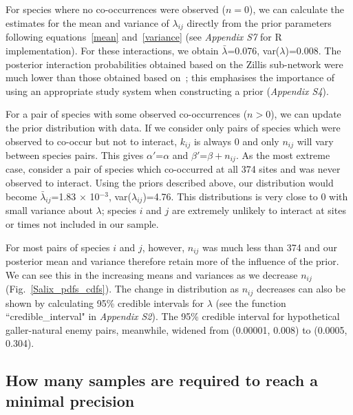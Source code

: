 \documentclass[12pt]{article}
\begin{document}
\begin{spacing}{2.0}
      For species where no co-occurrences were observed ($n=0$), we can calculate the estimates for the mean and variance of $\lambda_{ij}$ directly from the prior parameters following equations~\ref{mean} and~\ref{variance} (see \emph{Appendix S7} for R implementation). For these interactions, we obtain $\bar\lambda$=0.076, var($\lambda$)=0.008. The posterior interaction probabilities obtained based on the Zillis sub-network were much lower than those obtained based on~\citet[Data available from the Dryad Digital Repository: https://doi.org/10.5061/dryad.g7805]{Barbour2016}; this emphasises the importance of using an appropriate study system when constructing a prior (\emph{Appendix S4}).


      For a pair of species with some observed co-occurrences ($n>0$), we can update the prior distribution with data. If we consider only pairs of species which were observed to co-occur but not to interact, $k_{ij}$ is always 0 and only $n_{ij}$ will vary between species pairs. This gives $\alpha'$=$\alpha$ and $\beta'$=$\beta + n_{ij}$. As the most extreme case, consider a pair of species which co-occurred at all 374 sites and was never observed to interact. Using the priors described above, our distribution would become $\bar\lambda_{ij}$=1.83 $\times$ 10$^{-3}$, var($\lambda_{ij}$)=4.76. This distributions is very close to 0 with small variance about $\lambda$; species $i$ and $j$ are extremely unlikely to interact at sites or times not included in our sample.


      For most pairs of species $i$ and $j$, however, $n_{ij}$ was much less than 374 and our posterior mean and variance therefore retain more of the influence of the prior. We can see this in the increasing means and variances as we decrease $n_{ij}$ (Fig.~\ref{Salix_pdfs_cdfs}). The change in distribution as $n_{ij}$ decreases can also be shown  by calculating 95\% credible intervals for $\lambda$ (see the function ``credible\_interval" in \emph{Appendix S2}). The 95\% credible interval for hypothetical galler-natural enemy pairs, meanwhile, widened from (0.00001, 0.008) to (0.0005, 0.304).


  \subsection*{How many samples are required to reach a minimal precision}


\end{spacing}
\end{document}
